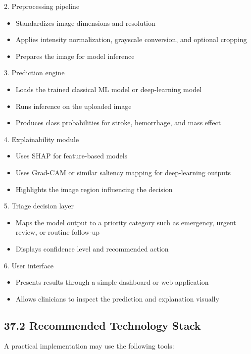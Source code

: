 \documentclass[12pt,a4paper]{report}
\begin{document}
2. Preprocessing pipeline
\begin{itemize}
\item Standardizes image dimensions and resolution
\item Applies intensity normalization, grayscale conversion, and optional cropping
\item Prepares the image for model inference
\end{itemize}

3. Prediction engine
\begin{itemize}
\item Loads the trained classical ML model or deep-learning model
\item Runs inference on the uploaded image
\item Produces class probabilities for stroke, hemorrhage, and mass effect
\end{itemize}

4. Explainability module
\begin{itemize}
\item Uses SHAP for feature-based models
\item Uses Grad-CAM or similar saliency mapping for deep-learning outputs
\item Highlights the image region influencing the decision
\end{itemize}

5. Triage decision layer
\begin{itemize}
\item Maps the model output to a priority category such as emergency, urgent review, or routine follow-up
\item Displays confidence level and recommended action
\end{itemize}

6. User interface
\begin{itemize}
\item Presents results through a simple dashboard or web application
\item Allows clinicians to inspect the prediction and explanation visually
\end{itemize}

\subsection{37.2 Recommended Technology Stack}

A practical implementation may use the following tools:
\end{document}
